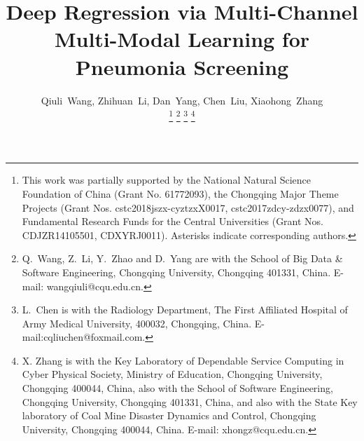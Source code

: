 \documentclass[journal]{IEEEtran}
\begin{document}
%
\title{Deep Regression via Multi-Channel Multi-Modal Learning for Pneumonia Screening}
%
%
%

\author{Qiuli~Wang,
        Zhihuan~Li,
        Dan~Yang,
        Chen~Liu,
        Xiaohong~Zhang%

\thanks{This work was partially supported by the National Natural Science Foundation of China (Grant No. 61772093), the Chongqing Major Theme Projects (Grant Nos. cstc2018jszx-cyztzxX0017, cstc2017zdcy-zdzx0077), and Fundamental Research Funds for the Central Universities (Grant Nos. CDJZR14105501, CDXYRJ0011). Asterisks indicate corresponding authors.
}
\thanks{Q.~Wang, Z.~Li, Y.~Zhao and D.~Yang are with the School of Big Data \& Software Engineering, Chongqing University, Chongqing 401331, China. E-mail: wangqiuli@cqu.edu.cn.}
\thanks{L.~Chen is with the Radiology Department, The First Affiliated Hospital of Army Medical University, 400032, Chongqing, China. E-mail:cqliuchen@foxmail.com. }
\thanks{X. Zhang is with the Key Laboratory of Dependable Service Computing in Cyber Physical Society, Ministry of Education, Chongqing University, Chongqing 400044, China, also with the School of Software Engineering, Chongqing University, Chongqing 401331, China, and also with the State Key laboratory of Coal Mine Disaster Dynamics and Control, Chongqing University, Chongqing 400044, China. E-mail: xhongz@cqu.edu.cn.}

}
\end{document}
